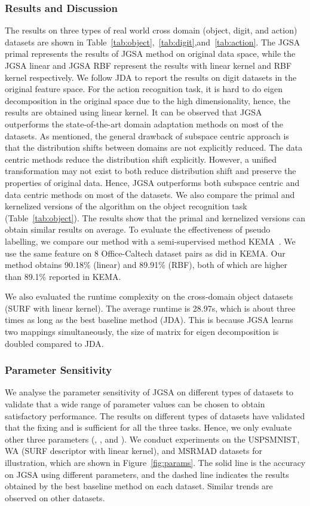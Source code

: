 \documentclass[10pt,twocolumn,letterpaper]{article}
\begin{document}
\subsubsection{Results and Discussion}
\vspace{-0.5em}
The results on three types of real world cross domain (object, digit, and action) datasets are shown in Table~\ref{tab:object},~\ref{tab:digit},and~\ref{tab:action}. The JGSA primal represents the results of JGSA method on original data space, while the JGSA linear and JGSA RBF represent the results with linear kernel and RBF kernel respectively. We follow JDA to report the results on digit datasets in the original feature space. For the action recognition task, it is hard to do eigen decomposition in the original space due to the high dimensionality, hence, the results are obtained using linear kernel. It can be observed that JGSA outperforms the state-of-the-art domain adaptation methods on most of the datasets.  
As mentioned, the general drawback of subspace centric approach is that the distribution shifts between domains are not explicitly reduced. 
The data centric methods reduce the distribution shift explicitly. However, a unified transformation may not exist to both reduce distribution shift and preserve the properties of original data. Hence, JGSA outperforms both subspace centric and data centric methods on most of the datasets. We also compare the primal and kernelized versions of the algorithm on the object recognition task (Table~\ref{tab:object}). The results show that the primal and kernelized versions can obtain similar results on average.
To evaluate the effectiveness of pseudo labelling, we compare our method with a semi-supervised method KEMA~\cite{Tuia2016}. We use the same  feature on 8 Office-Caltech dataset pairs as did in KEMA. Our method obtains 90.18\% (linear) and 89.91\% (RBF), both of which are higher than 89.1\% reported in KEMA. 

We also evaluated the runtime complexity on the cross-domain object datasets (SURF with linear kernel). The average runtime is 28.97s, which is about three times as long as the best baseline method (JDA). This is because JGSA learns two mappings simultaneously, the size of matrix for eigen decomposition is doubled compared to JDA.
\vspace{-1em}
\subsubsection{Parameter Sensitivity}
\vspace{-0.5em}
We analyse the parameter sensitivity of JGSA on different types of datasets to validate that a wide range of parameter values can be chosen to obtain satisfactory performance. The results on different types of datasets have validated that the fixing  and  is sufficient for all the three tasks. Hence, we only evaluate other three parameters (, , and ). We conduct experiments on the USPSMNIST, WA (SURF descriptor with linear kernel), and MSRMAD datasets for illustration, which are shown in Figure~\ref{fig:params}. The solid line is the accuracy on JGSA using different parameters, and the dashed line indicates the results obtained by the best baseline method on each dataset. Similar trends are observed on other datasets. 
\end{document}
